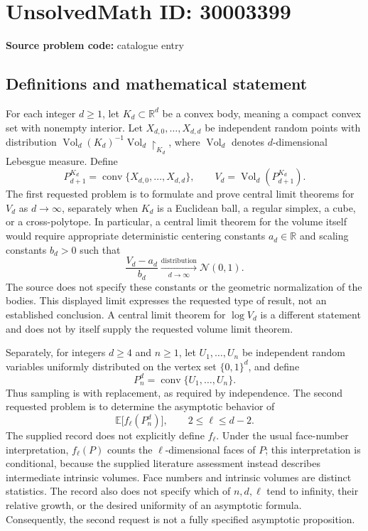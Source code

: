 \documentclass[11pt]{article}
\newcommand{\R}{\mathbb{R}}
\begin{document}
\section*{UnsolvedMath ID: 30003399}
\textbf{Source problem code:} catalogue entry
\subsection{Definitions and mathematical statement}
For each integer \(d\geq 1\), let \(K_d\subset\R^d\) be a convex body, meaning a compact convex set with nonempty interior. Let \(X_{d,0},\ldots,X_{d,d}\) be independent random points with distribution \(\operatorname{Vol}_d(K_d)^{-1}\operatorname{Vol}_d\!\restriction_{K_d}\), where \(\operatorname{Vol}_d\) denotes \(d\)-dimensional Lebesgue measure. Define
\[
P_{d+1}^{K_d}=\operatorname{conv}\{X_{d,0},\ldots,X_{d,d}\},\qquad V_d=\operatorname{Vol}_d(P_{d+1}^{K_d}).
\]
The first requested problem is to formulate and prove central limit theorems for \(V_d\) as \(d\to\infty\), separately when \(K_d\) is a Euclidean ball, a regular simplex, a cube, or a cross-polytope. In particular, a central limit theorem for the volume itself would require appropriate deterministic centering constants \(a_d\in\R\) and scaling constants \(b_d>0\) such that
\[
\frac{V_d-a_d}{b_d}\xrightarrow[d\to\infty]{\mathrm{distribution}}\mathcal N(0,1).
\]
The source does not specify these constants or the geometric normalization of the bodies. This displayed limit expresses the requested type of result, not an established conclusion. A central limit theorem for \(\log V_d\) is a different statement and does not by itself supply the requested volume limit theorem.

Separately, for integers \(d\geq4\) and \(n\geq1\), let \(U_1,\ldots,U_n\) be independent random variables uniformly distributed on the vertex set \(\{0,1\}^d\), and define
\[
P_n^d=\operatorname{conv}\{U_1,\ldots,U_n\}.
\]
Thus sampling is with replacement, as required by independence. The second requested problem is to determine the asymptotic behavior of
\[
\mathbb E\bigl[f_\ell(P_n^d)\bigr],\qquad 2\leq\ell\leq d-2.
\]
The supplied record does not explicitly define \(f_\ell\). Under the usual face-number interpretation, \(f_\ell(P)\) counts the \(\ell\)-dimensional faces of \(P\); this interpretation is conditional, because the supplied literature assessment instead describes intermediate intrinsic volumes. Face numbers and intrinsic volumes are distinct statistics. The record also does not specify which of \(n,d,\ell\) tend to infinity, their relative growth, or the desired uniformity of an asymptotic formula. Consequently, the second request is not a fully specified asymptotic proposition.
\end{document}
